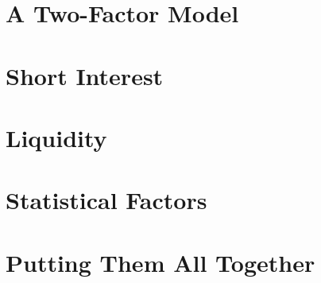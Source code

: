 \documentclass[11pt]{article}
\begin{document}
    \section*{A Two-Factor Model}

    \section*{Short  Interest}

    \section*{Liquidity}

    \section*{Statistical Factors}

    \section*{Putting Them All Together}
\end{document}
